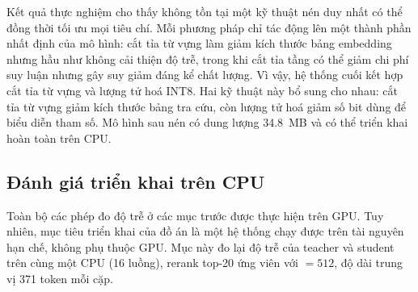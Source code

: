 \documentclass[../DoAn.tex]{subfiles}
\begin{document}
\begin{table}[H]
    \centering
    \caption{So sánh ba kỹ thuật nén}
    \label{tab:compression-summary}
    {\small
    \setlength{\tabcolsep}{4pt}
    }
\end{table}

Kết quả thực nghiệm cho thấy không tồn tại một kỹ thuật nén duy nhất có thể đồng thời tối ưu mọi tiêu chí. Mỗi phương pháp chỉ tác động lên một thành phần nhất định của mô hình: cắt tỉa từ vựng làm giảm kích thước bảng embedding nhưng hầu như không cải thiện độ trễ, trong khi cắt tỉa tầng có thể giảm chi phí suy luận nhưng gây suy giảm đáng kể chất lượng. Vì vậy, hệ thống cuối kết hợp cắt tỉa từ vựng và lượng tử hoá INT8. Hai kỹ thuật này bổ sung cho nhau: cắt tỉa từ vựng giảm kích thước bảng tra cứu, còn lượng tử hoá giảm số bit dùng để biểu diễn tham số. Mô hình sau nén có dung lượng 34.8~MB và có thể triển khai hoàn toàn trên CPU.

\subsection{Đánh giá triển khai trên CPU}
\label{subsection:cpu-deploy}

Toàn bộ các phép đo độ trễ ở các mục trước được thực hiện trên GPU. Tuy nhiên, mục tiêu triển khai của đồ án là một hệ thống chạy được trên tài nguyên hạn chế, không phụ thuộc GPU. Mục này đo lại độ trễ của teacher và student trên cùng một CPU (16 luồng), rerank top-20 ứng viên với  $=512$, độ dài trung vị 371 token mỗi cặp.
\end{document}
